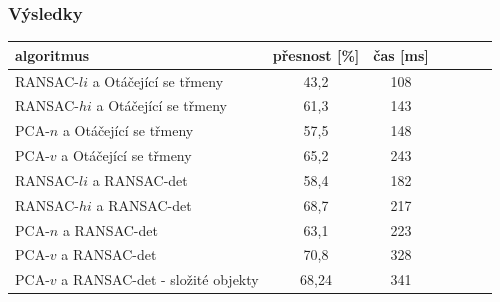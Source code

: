 \begin{frame}
    \frametitle{Výsledky}
    
\begin{table}[h]
    \centering
    \begin{tabular}{|l|c|c|c|c|c|c|} \hline
        algoritmus &  přesnost [\%]& čas [ms]\\ \hline \hline
        RANSAC-$li$ a Otáčející se třmeny & 43,2 & 108 \\ \hline
        RANSAC-$hi$ a Otáčející se třmeny & 61,3 & 143 \\ \hline
        PCA-$n$ a Otáčející se třmeny & 57,5 & 148 \\ \hline 
        PCA-$v$ a Otáčející se třmeny & 65,2 & 243 \\ \hline
        RANSAC-$li$ a RANSAC-det & 58,4 & 182 \\ \hline
        \cellcolor{cvut_navy}RANSAC-$hi$ a RANSAC-det & 68,7 & 217 \\ \hline
        PCA-$n$ a RANSAC-det & 63,1 & 223 \\ \hline 
        \cellcolor{cvut_navy}PCA-$v$ a RANSAC-det & 70,8 & 328 \\ \hline
        \cellcolor{cvut_navy}PCA-$v$ a RANSAC-det - složité objekty & 68,24 & 341 \\ \hline
    \end{tabular}
    \label{tab:vysledky}
\end{table}
\end{frame}

